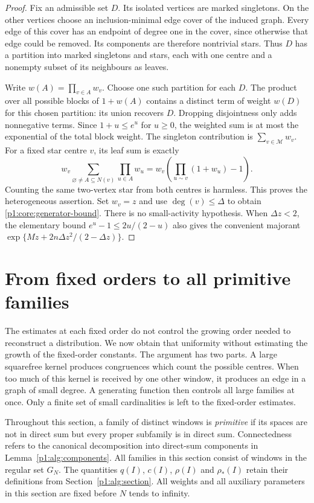\begin{proof}
Fix an admissible set $D$. Its isolated vertices are marked singletons.
On the other vertices choose an inclusion-minimal edge cover of the
induced graph. Every edge of this cover has an endpoint of degree one
in the cover, since otherwise that edge could be removed. Its
components are therefore nontrivial stars. Thus $D$ has a partition
into marked singletons and stars, each with one centre and a nonempty
subset of its neighbours as leaves.

Write $w(A)=\prod_{v\in A}w_v$. Choose one such partition for each $D$.
The product over all possible blocks of $1+w(A)$ contains a distinct
term of weight $w(D)$ for this chosen partition: its union recovers
$D$. Dropping disjointness only adds nonnegative terms. Since
$1+u\le e^u$ for $u\ge0$, the weighted sum is at most the exponential
of the total block weight. The singleton contribution is
$\sum_{v\in\mathcal M}w_v$. For a fixed star centre $v$, its leaf sum
is exactly
\[
 w_v\sum_{\varnothing\ne A\subseteq N(v)}\prod_{u\in A}w_u
   =w_v\left(\prod_{u\sim v}(1+w_u)-1\right).
\]
Counting the same two-vertex star from both centres is harmless.
This proves the heterogeneous assertion. Set $w_v=z$ and use
$\deg(v)\le\Delta$ to obtain \eqref{p1:core:generator-bound}.
There is no small-activity hypothesis. When $\Delta z<2$, the
elementary bound $e^u-1\le2u/(2-u)$ also gives the convenient
majorant $\exp\{Mz+2n\Delta z^2/(2-\Delta z)\}$.
\end{proof}
\section{From fixed orders to all primitive families}
\label{p1:core:section}

The estimates at each fixed order do not control the growing order needed
to reconstruct a distribution. We now obtain that uniformity without
estimating the growth of the fixed-order constants. The argument has two
parts. A large squarefree kernel produces congruences which count the
possible centres. When too much of this kernel is received by one other
window, it produces an edge in a graph of small degree. A generating
function then controls all large families at once. Only a finite set of
small cardinalities is left to the fixed-order estimates.

Throughout this section, a family of distinct windows is \emph{primitive}
if its spaces are not in direct sum but every proper subfamily is in
direct sum. Connectedness refers to the canonical decomposition into direct-sum
components in Lemma~\ref{p1:alg:components}.
All families in this section consist of windows in the regular set $G_N$.
The quantities $q(I)$, $c(I)$, $\rho(I)$ and $\rho_*(I)$ retain their
definitions from Section~\ref{p1:alg:section}. All weights and all auxiliary
parameters in this section are fixed before $N$ tends to infinity.

